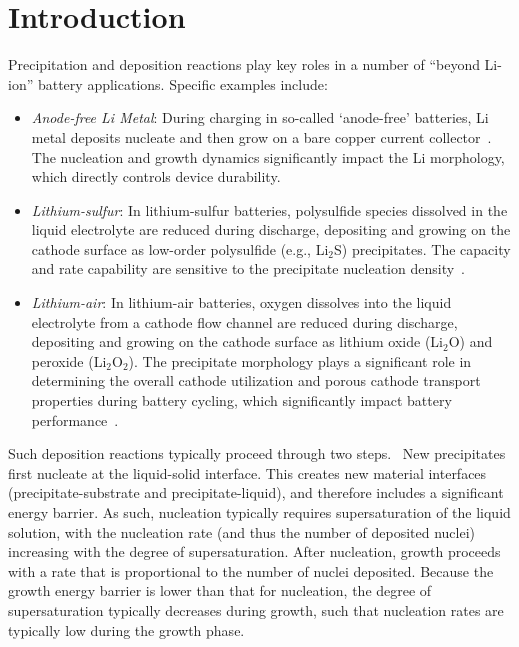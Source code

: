 \documentclass[final,3p,times,twocolumn, 12pt]{elsarticle}
\begin{document}
\section{Introduction}
Precipitation and deposition reactions play key roles in a number of ``beyond Li-ion'' battery applications. Specific examples include:
    \begin{itemize}
        \item \textit{Anode-free Li Metal}: During charging in so-called `anode-free' batteries, Li metal deposits nucleate and then grow on a bare copper current collector~\cite{bib:Li-Cu_deposition}. The nucleation and growth dynamics significantly impact the Li morphology, which directly controls device durability. \cite{bib:PSD_effects_Li,bib:PSD_effects_Li_2,bib:PSD_effects_Li_3,bib:PSD_effects_Li_4,bib:Model_ex_1}
        
        \item \textit{Lithium-sulfur}: In lithium-sulfur batteries, polysulfide species dissolved in the liquid electrolyte are reduced during discharge, depositing and growing on the cathode surface as low-order polysulfide (e.g., Li$_2$S) precipitates. The capacity and rate capability are sensitive to the precipitate nucleation density~\cite{bib:Li-S_deposition,bib:Li-S_deposition_2,bib:Model_ex_8}.
               
        \item \textit{Lithium-air}: In lithium-air batteries, oxygen dissolves into the liquid electrolyte from a cathode flow channel are reduced during discharge, depositing and growing on the cathode surface as lithium oxide (Li$_2$O) and peroxide (Li$_2$O$_2$). The precipitate morphology plays a significant role in determining the overall cathode utilization and porous cathode transport properties during battery cycling, which significantly impact battery performance~\cite{bib:Li-O_deposition,bib:Li-air_deposition}.
        
    \end{itemize}

Such deposition reactions typically proceed through two steps.~\cite{bib:classic_nuc_theory} New precipitates first nucleate at the liquid-solid interface. This creates new material interfaces (precipitate-substrate and precipitate-liquid), and therefore includes a significant energy barrier\cite{bib:Model_ex_2}. As such, nucleation typically requires supersaturation of the liquid solution, with the nucleation rate (and thus the number of deposited nuclei) increasing with the degree of supersaturation\cite{bib:supersat}.  After nucleation, growth proceeds with a rate that is proportional to the number of nuclei deposited. Because the growth energy barrier is lower than that for nucleation, the degree of supersaturation typically decreases  during growth, such that nucleation rates are typically low during the growth phase\cite{bib:Li-Cu_deposition}.
\end{document}
